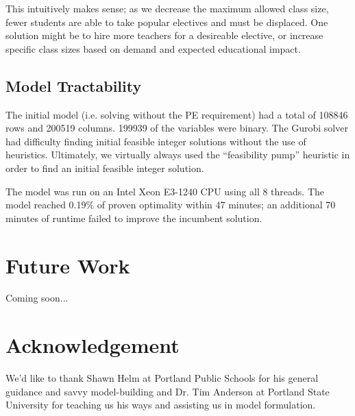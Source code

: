 \documentclass[12pt]{article}
\begin{document}
This intuitively makes sense; as we decrease the maximum allowed class size, fewer students are able to take popular electives and must be displaced. One solution might be to hire more teachers for a desireable elective, or increase specific class sizes based on demand and expected educational impact.

\subsection{Model Tractability}

The initial model (i.e. solving without the PE requirement) had a total of 108846 rows and 200519 columns. 199939 of the variables were binary. The Gurobi solver had difficulty finding initial feasible integer solutions without the use of heuristics. Ultimately, we virtually always used the ``feasibility pump'' \cite{Fischetti2005} heuristic in order to find an initial feasible integer solution.

The model was run on an Intel Xeon E3-1240 CPU using all 8 threads. The model reached 0.19\% of proven optimality within 47 minutes; an additional 70 minutes of runtime failed to improve the incumbent solution.


\section{Future Work}

Coming soon...

\section*{Acknowledgement}

We'd like to thank Shawn Helm at Portland Public Schools for his general guidance and savvy model-building and Dr. Tim Anderson at Portland State University for teaching us his ways and assisting us in model formulation.



\end{document}
